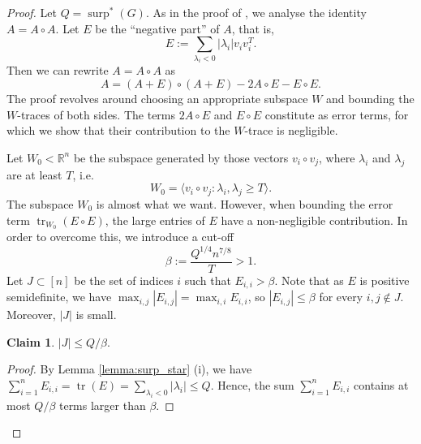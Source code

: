 \documentclass[11pt]{article}
\theoremstyle{plain}
\newtheorem{claim}[theorem]{Claim}
\theoremstyle{definition}
\DeclareMathOperator{\surp}{surp}
\DeclareMathOperator{\trace}{tr}
\begin{document}
\begin{proof}
Let $Q=\surp^*(G)$. 
As in the proof of , we analyse the identity $A=A\circ A$. Let $E$ be the ``negative part'' of $A$, that is, $$E:=\sum_{\lambda_i<0}|\lambda_i|v_iv_i^T.$$ 
Then we can rewrite $A=A\circ A$ as
\begin{equation}\label{equ:mainlemma1}
A=(A+E)\circ (A+E)-2A\circ E-E\circ E.
\end{equation}
The proof revolves around choosing an appropriate subspace $W$ and bounding the $W$-traces of both sides. The terms $2A\circ E$ and $E\circ E$ constitute as error terms, for which we show that their contribution to the $W$-trace is negligible.

Let $W_0<\mathbb{R}^n$ be the subspace generated by those vectors $v_i\circ v_j$, where $\lambda_i$ and $\lambda_j$ are at least $T$, i.e.
$$W_0=\langle v_i\circ v_j : \lambda_i,\lambda_j\geq T\rangle.$$
The subspace $W_0$ is almost what we want. However, when bounding the error term $\trace_{W_0}(E\circ E)$, the large entries of $E$ have a non-negligible contribution. In order to overcome this, we introduce a cut-off 
$$\beta:=\frac{Q^{1/4}n^{7/8}}{T}>1.$$
Let $J\subset[n]$ be the set of indices $i$ such that $E_{i,i}>\beta$. Note that as $E$ is positive semidefinite, we have $\max_{i,j}|E_{i,j}|=\max_{i,i}E_{i,i}$, so $|E_{i,j}|\leq \beta$ for every $i,j\notin J$. Moreover, $|J|$ is small.



\begin{claim}
$|J|\leq Q/\beta.$
\end{claim}
\begin{proof}
    By Lemma \ref{lemma:surp_star} (i), we have 
        $\sum_{i=1}^n E_{i,i}=\trace(E)=\sum_{\lambda_i<0}|\lambda_i|\leq Q.$
    Hence, the sum $\sum_{i=1}^n E_{i,i}$ contains at most $Q/\beta$ terms larger than $\beta$.
\end{proof}


\end{proof}
\end{document}
